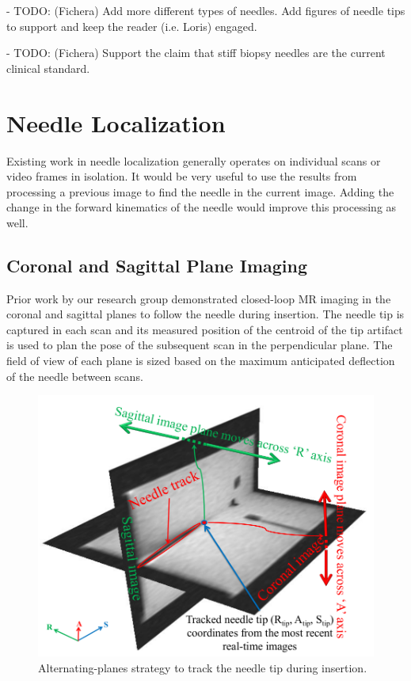- TODO: (Fichera) Add more different types of needles. Add figures of needle tips to support and keep the reader (i.e. Loris) engaged.

- TODO: (Fichera) Support the claim that stiff biopsy needles are the current clinical standard.




\section{Needle Localization}
Existing work in needle localization generally operates on individual scans or video frames in isolation. It would be very useful to use the results from processing a previous image to find the needle in the current image. Adding the change in the forward kinematics of the needle would improve this processing as well.

\subsection{Coronal and Sagittal Plane Imaging}
Prior work by our research group demonstrated closed-loop MR imaging in the coronal and sagittal planes to follow the needle during insertion\cite{patel_closed-loop_2015}. The needle tip is captured in each scan and its measured position of the centroid of the tip artifact is used to plan the pose of the subsequent scan in the perpendicular plane. The field of view of each plane is sized based on the maximum anticipated deflection of the needle between scans.

\begin{figure}[h]
\includegraphics[width=1.0\textwidth]{Fig/chap2/patel_mri_tracking.png}
\caption{Alternating-planes strategy to track the needle tip during insertion\cite{patel_closed-loop_2015}.}
\label{fig:needle_guide}
\end{figure}


